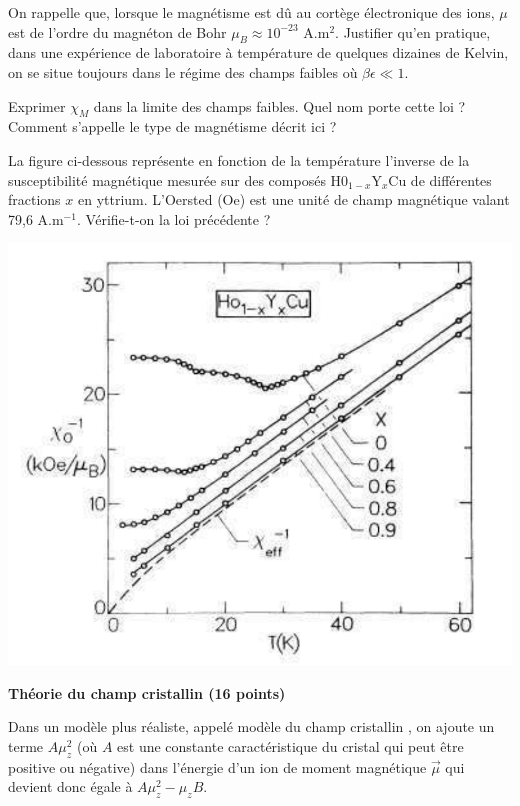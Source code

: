 \documentclass[utf8, 11pt]{feuille}
\begin{document}
\question On rappelle que, lorsque le magnétisme est dû au cortège électronique des ions, $\mu$ est de
l'ordre du magnéton de Bohr $\mu_B \approx 10^{-23}$ A.m$^2$. Justifier qu'en pratique, dans une expérience de laboratoire
à température de quelques dizaines de Kelvin, on se situe toujours dans le régime des champs faibles où $\beta \epsilon \ll 1$.

\question Exprimer $\chi_M$ dans la limite des champs faibles. Quel nom porte cette loi ? Comment s'appelle le
type de magnétisme décrit ici ?

\question La figure ci-dessous représente en fonction de la température l'inverse de la susceptibilité magnétique 
mesurée sur des composés H0$_{1-x}$Y$_x$Cu de différentes fractions $x$ en yttrium. L’Oersted (Oe) est une unité de champ magnétique valant 79,6 A.m$^{−1}$. Vérifie-t-on la loi précédente ?

\begin{center}
\includegraphics[scale=0.4]{SusceptibiliteMagnetique.png}
\end{center}

{\sffamily\bfseries{Théorie du champ cristallin (16 points)}}

Dans un modèle plus réaliste, appelé modèle du \og champ cristallin \fg , on ajoute un terme  $A \mu_z^2$ (où $A$ est une constante caractéristique du cristal  qui peut être positive ou négative) dans l'énergie d'un ion de moment magnétique $\Vec{\mu}$ qui devient donc égale à  $A \mu_z^2 -\mu_z B$.
\end{document}
